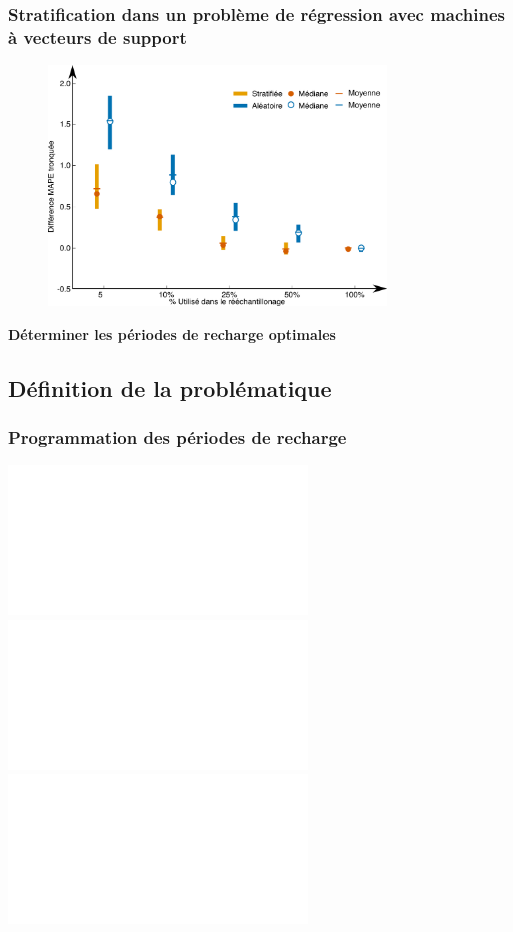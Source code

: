 \documentclass[french]{beamer}
\begin{document}
{\begin{frame}
\frametitle{Stratification dans un problème de régression avec machines à vecteurs de support} 
\begin{figure}
\begin{center}
\includegraphics[width=0.8\textwidth]{figDiff_SVR_Inp_state_year_2003.pdf}
\end{center}
\end{figure}
\end{frame}

{
\begin{frame}
\begin{center}
\huge \textbf{Déterminer les périodes de recharge optimales}
\end{center}
\end{frame}
}
\addtocounter{framenumber}{-1}


\subsection{Définition de la problématique}

\begin{frame}
\begin{center}
\frametitle{Programmation des périodes de recharge}
\includegraphics<1>[width=0.9\linewidth]{obj01.pdf}
\includegraphics<2>[width=0.9\linewidth]{obj02.pdf}
\includegraphics<3>[width=0.9\linewidth]{obj03.pdf}
\end{center}
\end{frame}


}
\end{document}
